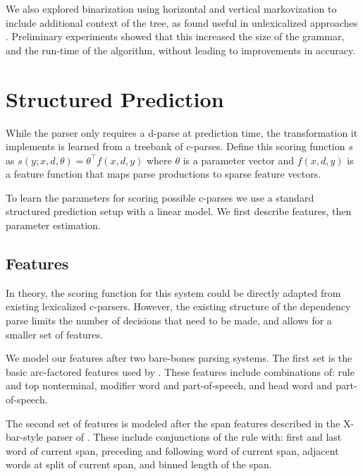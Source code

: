 \documentclass[11pt,letterpaper]{article}
\newcommand{\lpkcomment}[1]{\textcolor{red}{\bf \small [#1 --lpk]}}
\begin{document}
We also explored binarization using horizontal and vertical
markovization to include additional context of the tree, as found
useful in unlexicalized approaches \cite{klein2003accurate}.
Preliminary experiments showed that this increased the size of the
grammar, and the run-time of the algorithm, without leading to
improvements in accuracy.






\section{Structured Prediction}
\label{sec:strpred}
While the parser only requires a d-parse at prediction time, 
the transformation it implements is learned from a treebank of c-parses.
Define this scoring function $s$ as $s(y;x, d, \theta) =  \theta^{\top} f(x, d, y)$
where $\theta$ is a parameter vector and $f(x, d, y)$ is a feature
function that maps parse productions to sparse feature vectors. 

To learn the parameters for scoring possible c-parses we use a standard
structured prediction setup with a linear model. We first describe
features, then parameter estimation.


\subsection{Features}

In theory, the scoring function for this system could be directly
adapted from existing lexicalized c-parsers. However, the existing structure of
the dependency parse limits the number of decisions that need to be
made, and allows for a smaller set of features.

We model our features after two bare-bones parsing systems. 
The first set is the basic arc-factored features 
used by . These features include combinations of:
rule and top nonterminal, modifier word and part-of-speech, and  head word and part-of-speech.

The second set of features is modeled after the span features
described in the X-bar-style parser of . These
include conjunctions of the rule with: first and last word of current span,
 preceding and following word of current span, adjacent words at split of current span, and binned length of the span.
\end{document}
